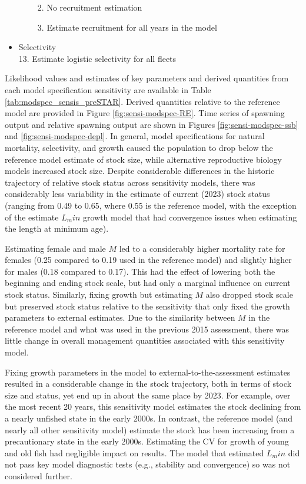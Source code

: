 \documentclass[11pt,
  english,
  letterpaper,
]{article}
\providecommand{\tightlist}{%
  \setlength{\itemsep}{0pt}\setlength{\parskip}{0pt}}
\providecommand{\tightlist}{%
  \setlength{\itemsep}{0pt}\setlength{\parskip}{0pt}}
\begin{document}
\begin{itemize}
\begin{itemize}
    \begin{enumerate}
    \def\labelenumi{\arabic{enumi}.}
    \setcounter{enumi}{10}
    \tightlist
    \item
      No recruitment estimation
    \item
      Estimate recruitment for all years in the model
    \end{enumerate}
  \end{itemize}
\item
  Selectivity\\
  13. Estimate logistic selectivity for all fleets
\end{itemize}

Likelihood values and estimates of key parameters and derived quantities from each model specification sensitivity are available in Table \ref{tab:modspec_sensis_preSTAR}. Derived quantities relative to the reference model are provided in Figure \ref{fig:sensi-modspec-RE}. Time series of spawning output and relative spawning output are shown in Figures \ref{fig:sensi-modspec-ssb} and \ref{fig:sensi-modspec-depl}. In general, model specifications for natural mortality, selectivity, and growth caused the population to drop below the reference model estimate of stock size, while alternative reproductive biology models increased stock size. Despite considerable differences in the historic trajectory of relative stock status across sensitivity models, there was considerably less variability in the estimate of current (2023) stock status (ranging from 0.49 to 0.65, where 0.55 is the reference model, with the exception of the estimate \(L_min\) growth model that had convergence issues when estimating the length at minimum age).

Estimating female and male \(M\) led to a considerably higher mortality rate for females (0.25 compared to 0.19 used in the reference model) and slightly higher for males (0.18 compared to 0.17). This had the effect of lowering both the beginning and ending stock scale, but had only a marginal influence on current stock status. Similarly, fixing growth but estimating \(M\) also dropped stock scale but preserved stock status relative to the sensitivity that only fixed the growth parameters to external estimates. Due to the similarity between \(M\) in the reference model and what was used in the previous 2015 assessment, there was little change in overall management quantities associated with this sensitivity model.

Fixing growth parameters in the model to external-to-the-assessment estimates resulted in a considerable change in the stock trajectory, both in terms of stock size and status, yet end up in about the same place by 2023. For example, over the most recent 20 years, this sensitivity model estimates the stock declining from a nearly unfished state in the early 2000s. In contrast, the reference model (and nearly all other sensitivity model) estimate the stock has been increasing from a precautionary state in the early 2000s. Estimating the CV for growth of young and old fish had negligible impact on results. The model that estimated \(L_min\) did not pass key model diagnostic tests (e.g., stability and convergence) so was not considered further.
\end{document}
